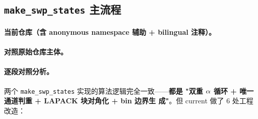 \subsection{\texttt{make\_swp\_states} 主流程}
\label{subsec:ch06-code-swp-main}

\paragraph{当前仓库（含 anonymous namespace 辅助 + bilingual 注释）。}


\paragraph{对照原始仓库主体。}


\paragraph{逐段对照分析。}
两个 \texttt{make\_swp\_states} 实现的算法逻辑完全一致——\textbf{都是
"双重 \(\alpha\) 循环 + 唯一通道判重 + LAPACK 块对角化 + bin 边界生
成"}。但 current 做了 6 处工程改造：

